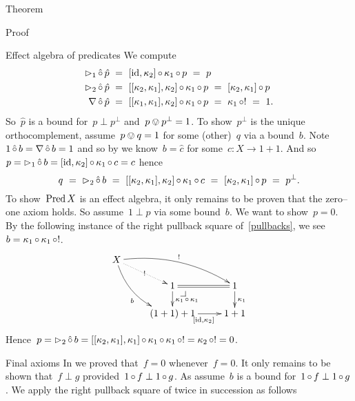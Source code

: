 \documentclass[b]{subfiles}
\begin{document}
\begin{parsec}
\begin{point}{Theorem}
\begin{point}{Proof}
\begin{point}{Effect algebra of predicates}
We compute
\begin{align*}
    \mathord{\vartriangleright}_1 \mathop{\hat\circ} \hat{p}
    &\ = \ [\operatorname{id},\kappa_2]\mathop{\circ}\kappa_1 \mathop{\circ} p
        \  = \ p \\
        \mathord{\vartriangleright}_2 \mathop{\hat\circ} \hat{p}
    &\ = \ [[\kappa_2, \kappa_1],\kappa_2]\mathop{\circ}\kappa_1 \mathop{\circ} p
        \  = \ [\kappa_2,\kappa_1]\mathop{\circ} p \\
    \nabla \mathop{\hat\circ} \hat{p}
    &\ = \ [[\kappa_1,\kappa_1],\kappa_2]\mathop{\circ}\kappa_1 \mathop{\circ} p
        \  = \ \kappa_1 \mathop{\circ} ! \ = \ 1.
\end{align*}
So~$\hat{p}$ is a bound for~$p \perp p^\perp$
and~$p \ovee p^\perp = 1$.
To show~$p^\perp$ is the unique orthocomplement,
    assume~$p \ovee q = 1$ for some (other)~$q$ via a bound~$b$.
Note~$1 \mathop{\hat\circ} b =\nabla \mathop{\hat\circ} b = 1$
    and so by 
    we know~$b = \hat{c}$ for some~$c\colon X \to 1+1$.
    And so~$p = \mathord{\vartriangleright}_1 \mathop{\hat\circ} b = [\operatorname{id}, \kappa_2]\mathop{\circ} \kappa_1 \mathop{\circ} c
                    = c$
                    hence
\begin{equation*}
q \ =\  \pproj_2 \hafter b \ =\  [[\kappa_2, \kappa_1],\kappa_2] \after
    \kappa_1\after c \ =\  [\kappa_2,\kappa_1]\after p \ =\  p^\perp.
\end{equation*}
To show~$\operatorname{Pred} X$ is an effect algebra,
it only remains to be proven that the zero--one axiom holds.
So assume~$1 \perp p$ via some bound~$b$. We want to show~$p=0$.
By the following instance of the right pullback square of~\eqref{pullbacks},
    we see~$b = \kappa_1 \mathop{\circ} \kappa_1 \mathop{\circ} !$.
\begin{equation*}
    \xymatrix@R-.8pc{
        X \ar@{.>}[rd]|{!}
    \ar@/^1pc/[rrd]^{!}
        \ar@/_1pc/[rdd]_b
        \\& 1 \pullback
        \ar@{=}[r]
        \ar[d]^{\kappa_1\after\kappa_1}
    & 1
        \ar[d]^{\kappa_1}
        \\& (1+1)+1
        \ar[r]_{[\id,\kappa_2]}
&1+1
}
\end{equation*}
Hence~$p = \mathord{\vartriangleright}_2 \mathop{\hat\circ} b = [[\kappa_2,\kappa_1],\kappa_1]\mathop{\circ}
                        \kappa_1 \mathop{\circ} \kappa_1 \mathop{\circ} ! = \kappa_2 \mathop{\circ} ! = 0$.
\end{point}
\begin{point}{Final axioms}%
In  we proved that~$f = 0$ whenever~$f = 0$.
It only remains to be shown that~$f \perp g$
    provided~$1 \mathop{\circ} f \perp 1 \mathop{\circ} g$.
As assume~$b$ is a bound for~$1 \mathop{\circ} f \perp 1 \mathop{\circ} g$.
We apply the right pullback square of 
    twice  in succession as follows

\end{point}
\end{point}
\end{point}
\end{parsec}
\end{document}
